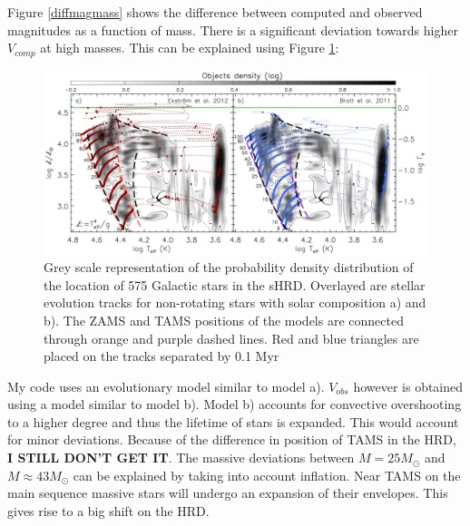 \documentclass[a4paper,10pt]{article}
\begin{document}
 Figure \ref{diffmagmass} shows the difference between computed and observed magnitudes as a function of mass. There is a significant
 deviation towards higher $V_{comp}$ at high masses. This can be explained using Figure \ref{castroetal}:
 \begin{figure}
  \includegraphics[width=\textwidth]{Castroetal}
  \caption{Grey scale representation of the probability density distribution of the location of 575 Galactic stars in the sHRD.
  Overlayed are stellar evolution tracks for non-rotating stars with solar composition a)\citet{2012A&A...537A.146E}
  and b)\citet{2011yCat..35309115B}. The ZAMS and TAMS positions of the models are connected through orange and purple dashed lines.
  Red and blue triangles are placed on the tracks separated by 0.1 Myr \citep{2014A&A...570L..13C}\label{castroetal}}
 \end{figure}

 My code uses an evolutionary model similar to model a). $V_{obs}$ however is obtained using a model similar to model b).
 Model b) accounts for convective overshooting to a higher degree and thus the lifetime of stars is expanded. This would account for
 minor deviations. Because of the difference in position of TAMS in the HRD, \textbf{I STILL DON'T GET IT}.
 The massive deviations between $M=25M_\odot$ and $M\approx 43M_\odot$ can be explained by taking into account inflation. 
 Near TAMS on the main sequence massive stars will undergo an expansion of their envelopes. This gives rise to a big shift on the
 HRD.
 
\end{document}
